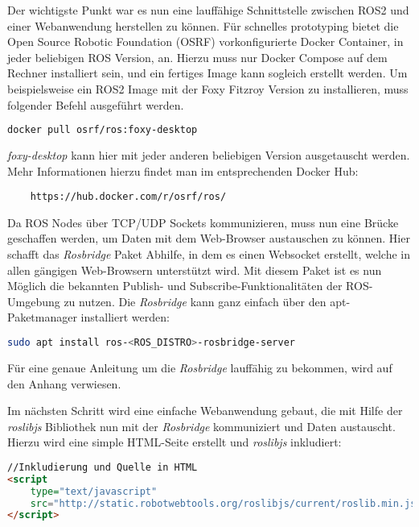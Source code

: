 \begin{flushleft}

Der wichtigste Punkt war es nun eine lauffähige Schnittstelle zwischen ROS2 und einer Webanwendung herstellen zu können. Für schnelles prototyping bietet die Open Source Robotic Foundation (OSRF) vorkonfigurierte Docker Container, in jeder beliebigen ROS Version, an. Hierzu muss nur Docker Compose auf dem Rechner installiert sein, und ein fertiges Image kann sogleich erstellt werden. Um beispielsweise ein ROS2 Image mit der Foxy Fitzroy Version zu installieren, muss folgender Befehl ausgeführt werden. 
\begin{lstlisting}[language=bash]
    docker pull osrf/ros:foxy-desktop 
\end{lstlisting}

\textit{foxy-desktop} kann hier mit jeder anderen beliebigen Version ausgetauscht werden. Mehr Informationen hierzu findet man im entsprechenden Docker Hub: 
\begin{lstlisting}
    https://hub.docker.com/r/osrf/ros/
\end{lstlisting}

Da ROS Nodes über TCP/UDP Sockets kommunizieren, muss nun eine Brücke geschaffen werden, um Daten mit dem Web-Browser austauschen zu können. Hier schafft das \textit{Rosbridge} Paket Abhilfe, in dem es einen Websocket erstellt, welche in allen gängigen Web-Browsern unterstützt wird. Mit diesem Paket ist es nun Möglich die bekannten Publish- und Subscribe-Funktionalitäten der ROS-Umgebung zu nutzen. Die \textit{Rosbridge} kann ganz einfach über den apt-Paketmanager installiert werden:

\begin{lstlisting}[language=bash]
    sudo apt install ros-<ROS_DISTRO>-rosbridge-server 
\end{lstlisting}


Für eine genaue Anleitung um die \textit{Rosbridge} lauffähig zu bekommen, wird auf den Anhang verwiesen. 

Im nächsten Schritt wird eine einfache Webanwendung gebaut, die mit Hilfe der \textit{roslibjs} Bibliothek nun mit der \textit{Rosbridge} kommuniziert und Daten austauscht. 
Hierzu wird eine simple HTML-Seite erstellt und \textit{roslibjs} inkludiert:

\begin{lstlisting}[language=html]
//Inkludierung und Quelle in HTML
<script 
    type="text/javascript" 
    src="http://static.robotwebtools.org/roslibjs/current/roslib.min.js">
</script> 



\end{lstlisting}
\end{flushleft}
